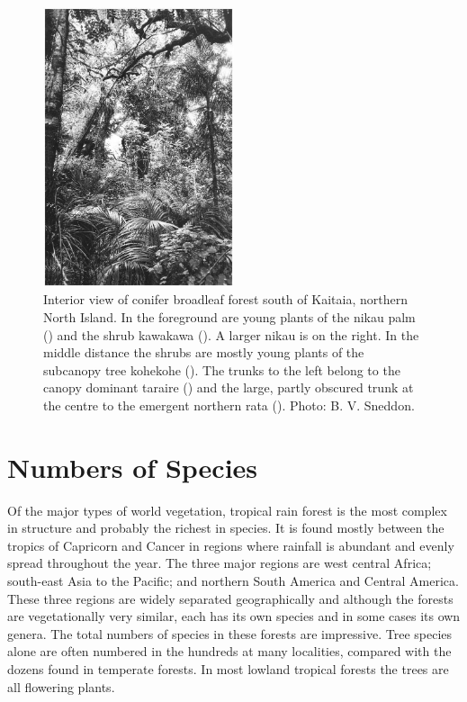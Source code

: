 \begin{figure}
	\includegraphics[width=0.5\textwidth]{graphics/figure8conifer.jpg}
	\centering
	\caption[Interior view of conifer broadleaf forest south of Kaitaia]{Interior view of conifer broadleaf forest south of Kaitaia, northern North Island.
    In the foreground are young plants of the nikau palm () and the shrub kawakawa ().
    A larger nikau is on the right.
    In the middle distance the shrubs are mostly young plants of the subcanopy tree kohekohe ().
    The trunks to the left belong to the canopy dominant taraire () and the large, partly obscured trunk at the centre to the emergent northern rata ().
	Photo: B. V. Sneddon.}
	\label{fig:8conifer}
\end{figure}

\section{Numbers of Species}

Of the major types of world vegetation, tropical rain forest is the most complex in structure and probably the richest in species.
It is found mostly between the tropics of Capricorn and Cancer in regions where rainfall is abundant and evenly spread throughout the year.
The three major regions are west central Africa; south-east Asia to the Pacific; and northern South America and Central America.
These three regions are widely separated geographically and although the forests are vegetationally very similar, each has its own species and in some cases its own genera.
The total numbers of species in these forests are impressive.
Tree species alone are often numbered in the hundreds at many localities, compared with the dozens found in temperate forests.
In most lowland tropical forests the trees are all flowering plants.

